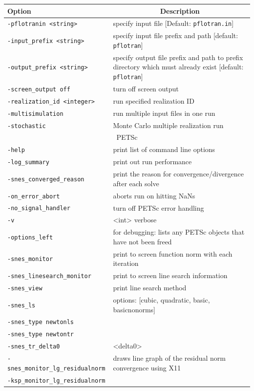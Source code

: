{\begin{tabular}{lp{9cm}}
\toprule
Option & \multicolumn{1}{c}{Description}\\
\midrule
{\tt -pflotranin <string>} & specify input file [Default: {\tt pflotran.in}]\\
{\tt -input\_prefix <string>} & specify input file prefix and path [default: {\tt pflotran}]\\
{\tt -output\_prefix <string>} & specify output file prefix and path to prefix directory which must already exist [default: {\tt pflotran}]\\
{\tt -screen\_output off} & turn off screen output\\
{\tt -realization\_id <integer>} & run specified realization ID\\
{\tt -multisimulation} & run multiple input files in one run\\
{\tt -stochastic} & Monte Carlo multiple realization run\\
\midrule
\multicolumn{2}{c}{PETSc}\\
\midrule
{\tt -help} & print list of command line options\\
{\tt -log\_summary} & print out run performance\\
{\tt -snes\_converged\_reason} & print the reason for convergence/divergence after each solve\\
{\tt -on\_error\_abort} & aborts run on hitting NaNs\\
\texttt{-no\_signal\_handler} & turn off PETSc error handling\\
{\tt -v} & <int> verbose\\
{\tt -options\_left} & for debugging: lists any PETSc objects that have not been freed\\
{\tt -snes\_monitor} & print to screen function norm with each iteration\\
{\tt -snes\_linesearch\_monitor} & print to screen line search information\\
{\tt -snes\_view} & print line search method\\
{\tt -snes\_ls} & options: [cubic, quadratic, basic, basicnonorms] \\
{\tt -snes\_type newtonls} & \\
{\tt -snes\_type newtontr} & \\
{\tt -snes\_tr\_delta0} & <delta0>\\
{\tt -snes\_monitor\_lg\_residualnorm} & draws line graph of the residual norm convergence using X11\\
{\tt -ksp\_monitor\_lg\_residualnorm} & \\
\bottomrule
\end{tabular}

}
